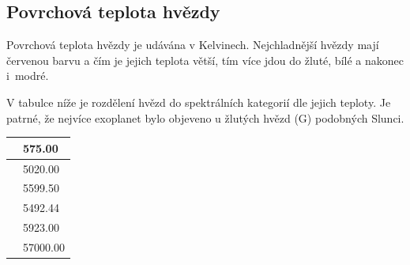 \documentclass[a4paper,12pt]{article}
\begin{document}
\subsection{Povrchová teplota hvězdy}

\setlength{\columnsep}{0.43\textwidth}
\begin{multicols}{2}
\begin{minipage}{0.7\textwidth}
Povrchová teplota hvězdy je udávána v Kelvinech. Nejchladnější hvězdy mají červenou barvu a čím je jejich teplota větší, tím více jdou do žluté, bílé a nakonec i~modré.

V tabulce níže je rozdělení hvězd do spektrálních kategorií dle jejich teploty. Je patrné, že nejvíce exoplanet bylo objeveno u žlutých hvězd (G) podobných Slunci.

\end{minipage}
\begin{minipage}{0.3\textwidth}
\begin{tabular}{| l| l|}
   \hline
{\cellcolor[rgb]{0.85, 0.85, 0.85}{ Min }} & 575.00 \\ 
   \hline
{\cellcolor[rgb]{0.85, 0.85, 0.85}{ Qu1 }} & 5020.00 \\ 
   \hline
{\cellcolor[rgb]{0.85, 0.85, 0.85}{ Median }} & 5599.50 \\ 
   \hline
{\cellcolor[rgb]{0.85, 0.85, 0.85}{ Mean }} & 5492.44 \\ 
   \hline
{\cellcolor[rgb]{0.85, 0.85, 0.85}{ Qu3 }} & 5923.00 \\ 
   \hline
{\cellcolor[rgb]{0.85, 0.85, 0.85}{ Max }} & 57000.00 \\ 
   \hline
\end{tabular}\end{minipage}
\end{multicols}
\end{document}
